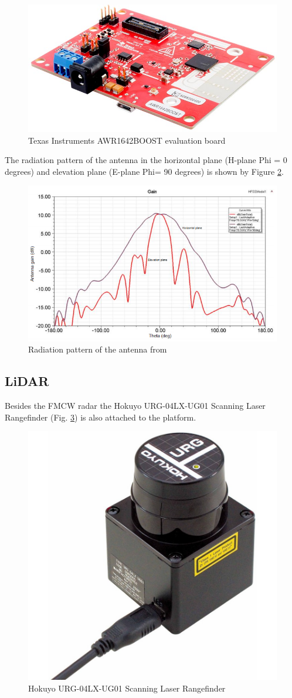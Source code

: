\begin{figure}[ht!] 
\centerline{\includegraphics [width=0.5 \textwidth]{imgs/chapter4/awr1642.jpg}}
\caption{Texas Instruments AWR1642BOOST evaluation board}
\label{fig:awr}
\end{figure}


The radiation pattern of the antenna in the horizontal plane (H-plane Phi = 0 degrees) and elevation plane (E-plane Phi= 90 degrees) is shown by Figure \ref{fig:el}.
\begin{figure}[ht!] 
\centerline{\includegraphics [width=0.9 \textwidth]{imgs/chapter4/elevation.png}}
\caption[Radiation pattern of the antenna]{Radiation pattern of the antenna from \cite{el}}
\label{fig:el}
\end{figure}

\subsection{LiDAR}
Besides the \ac{FMCW} \ac{radar} the Hokuyo URG-04LX-UG01 Scanning Laser Rangefinder (Fig. \ref{fig:lidar}) is also attached to the platform.

\begin{figure}[ht!] 
\centerline{\includegraphics [width=0.3 \textwidth]{imgs/chapter4/lidar.jpg}}
\caption{Hokuyo URG-04LX-UG01 Scanning Laser Rangefinder}
\label{fig:lidar}
\end{figure}

